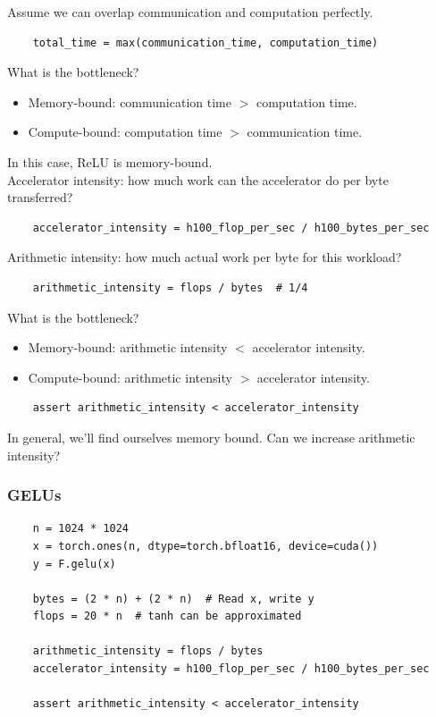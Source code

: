 \documentclass[12pt,twoside]{article}
\begin{document}
Assume we can overlap communication and computation perfectly.

\begin{verbatim}
    total_time = max(communication_time, computation_time)  
\end{verbatim}

What is the bottleneck?

\begin{itemize}
    \item Memory-bound: communication time \(>\) computation time.
    \item Compute-bound: computation time \(>\) communication time.
\end{itemize}

In this case, ReLU is memory-bound. \\

Accelerator intensity: how much work can the accelerator do per byte transferred?

\begin{verbatim}
    accelerator_intensity = h100_flop_per_sec / h100_bytes_per_sec  
\end{verbatim}

Arithmetic intensity: how much actual work per byte for this workload?

\begin{verbatim}
    arithmetic_intensity = flops / bytes  # 1/4
\end{verbatim}

What is the bottleneck?

\begin{itemize}
    \item Memory-bound: arithmetic intensity \(<\) accelerator intensity.
    \item Compute-bound: arithmetic intensity \(>\) accelerator intensity.
\end{itemize}

\begin{verbatim}
    assert arithmetic_intensity < accelerator_intensity
\end{verbatim}

In general, we'll find ourselves memory bound. Can we increase arithmetic intensity?

\subsubsection*{GELUs}

\begin{verbatim}
    n = 1024 * 1024
    x = torch.ones(n, dtype=torch.bfloat16, device=cuda())
    y = F.gelu(x) 
    
    bytes = (2 * n) + (2 * n)  # Read x, write y
    flops = 20 * n  # tanh can be approximated
    
    arithmetic_intensity = flops / bytes  
    accelerator_intensity = h100_flop_per_sec / h100_bytes_per_sec 
    
    assert arithmetic_intensity < accelerator_intensity
\end{verbatim}
\end{document}
